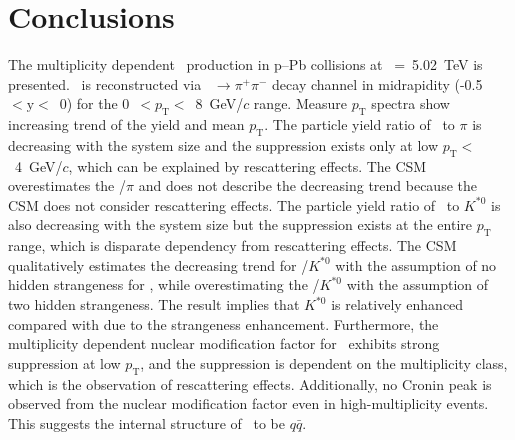 
\section{Conclusions}
\label{sec:summary}

The multiplicity dependent \fzero~production in p--Pb collisions at \snn~=~5.02~TeV is presented. \fzero~is reconstructed via \fzero~$\rightarrow\pi^{+}\pi^{-}$ decay channel in midrapidity (-0.5~$<\mathrm{y}<$~0) for the 0~$<p_{\mathrm{T}}<$~8~GeV/$c$ range. Measure $p_{\mathrm{T}}$ spectra show increasing trend of the yield and mean $p_{\mathrm{T}}$. The particle yield ratio of \fzero~to $\pi$ is decreasing with the system size and the suppression exists only at low $p_{\mathrm{T}}<$~4~GeV/$c$, which can be explained by rescattering effects. The CSM overestimates the \fzero/$\pi$ and does not describe the decreasing trend because the CSM does not consider rescattering effects. The particle yield ratio of \fzero~to $K^{*0}$ is also decreasing with the system size but the suppression exists at the entire $p_{\mathrm{T}}$ range, which is disparate dependency from rescattering effects. The CSM qualitatively estimates the decreasing trend for \fzero/$K^{*0}$ with the assumption of no hidden strangeness for \fzero, while overestimating the \fzero/$K^{*0}$ with the assumption of two hidden strangeness. The result implies that $K^{*0}$ is relatively enhanced compared with \fzero due to the strangeness enhancement. Furthermore, the multiplicity dependent nuclear modification factor for \fzero~exhibits strong suppression at low $p_{\mathrm{T}}$, and the suppression is dependent on the multiplicity class, which is the observation of rescattering effects. Additionally, no Cronin peak is observed from the nuclear modification factor even in high-multiplicity events. This suggests the internal structure of \fzero~to be $q\bar{q}$.
